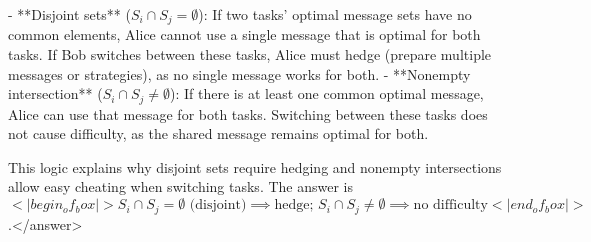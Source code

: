 - **Disjoint sets** (\( S_i \cap S_j = \emptyset \)): If two tasks’ optimal message sets have no common elements, Alice cannot use a single message that is optimal for both tasks. If Bob switches between these tasks, Alice must hedge (prepare multiple messages or strategies), as no single message works for both.  
- **Nonempty intersection** (\( S_i \cap S_j \neq \emptyset \)): If there is at least one common optimal message, Alice can use that message for both tasks. Switching between these tasks does not cause difficulty, as the shared message remains optimal for both.  

This logic explains why disjoint sets require hedging and nonempty intersections allow easy cheating when switching tasks.  
The answer is \(<|begin_of_box|>S_i \cap S_j = \emptyset \text{ (disjoint)} \implies \text{hedge; } S_i \cap S_j \neq \emptyset \implies \text{no difficulty}<|end_of_box|>\).</answer>